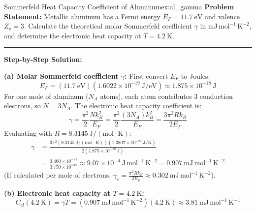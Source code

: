 \documentclass[11pt,a4paper]{article}
\begin{document}
\vspace{0.4cm}

\begin{examplebox}{Sommerfeld Heat Capacity Coefficient of Aluminum}{ex:al_gamma}
\textbf{Problem Statement:}
Metallic aluminum has a Fermi energy $E_F = 11.7\ \mathrm{eV}$ and valence $Z_v = 3$. Calculate the theoretical molar Sommerfeld coefficient $\gamma$ in $\mathrm{mJ\,mol^{-1}\,K^{-2}}$, and determine the electronic heat capacity at $T = 4.2\ \mathrm{K}$.

\vspace{0.2cm}\hrule\vspace{0.2cm}
\textbf{Step-by-Step Solution:}

\textbf{(a) Molar Sommerfeld coefficient $\gamma$:}
First convert $E_F$ to Joules:
\[
E_F = (11.7\ \mathrm{eV})(1.6022 \times 10^{-19}\ \mathrm{J/eV}) \approx 1.875 \times 10^{-18}\ \mathrm{J}
\]
For one mole of aluminum ($N_A$ atoms), each atom contributes $3$ conduction electrons, so $N = 3 N_A$. The electronic heat capacity coefficient is:
\[
\gamma = \frac{\pi^2}{2}\frac{N k_B^2}{E_F} = \frac{\pi^2}{2}\frac{(3 N_A) k_B^2}{E_F} = \frac{3\pi^2 R k_B}{2 E_F}
\]
Evaluating with $R = 8.3145\ \mathrm{J/(mol\cdot K)}$:
\begin{align*}
\gamma &= \frac{3\pi^2 (8.3145\ \mathrm{J/(mol\cdot K)})(1.3807 \times 10^{-23}\ \mathrm{J/K})}{2(1.875 \times 10^{-18}\ \mathrm{J})} \\
&= \frac{3.400 \times 10^{-21}}{3.750 \times 10^{-18}} \approx 9.07 \times 10^{-4}\ \mathrm{J\,mol^{-1}\,K^{-2}} = \mathbf{0.907\ \mathrm{mJ\,mol^{-1}\,K^{-2}}}
\end{align*}
(If calculated per mole of electrons, $\gamma_e = \frac{\pi^2 R k_B}{2E_F} \approx 0.302\ \mathrm{mJ\,mol^{-1}\,K^{-2}}$).

\textbf{(b) Electronic heat capacity at $T = 4.2\ \mathrm{K}$:}
\[
C_{el}(4.2\ \mathrm{K}) = \gamma T = (0.907\ \mathrm{mJ\,mol^{-1}\,K^{-2}})(4.2\ \mathrm{K}) \approx \mathbf{3.81\ \mathrm{mJ\,mol^{-1}\,K^{-1}}}
\]
\end{examplebox}

\vspace{0.4cm}
\end{document}
